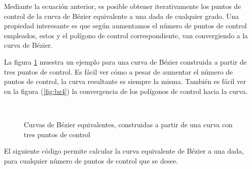 \begin{paracol}{2}
Mediante la ecuación anterior, es posible obtener iterativamente los puntos de control de la curva de Bézier equivalente a una dada de cualquier grado. Una propiedad interesante es que según aumentamos el número de puntos de control empleados, estos y el polígono de control correspondiente, van convergiendo a la curva de Bézier. 

La figura \ref{fig:bzgrad} muestra un ejemplo para una curva de Bézier construida a partir de tres puntos de control. Es fácil ver cómo a pesar de aumentar el número de puntos de control, la curva resultante es siempre la misma.  También es fácil ver en la figura (\ref{fig:bz4}) la convergencia de los polígonos de control hacia la curva.
\end{paracol}
\begin{figure}[h]
\centering
{} \qquad 
{}\\
 \qquad 
{}
\caption{Curvas de Bézier equivalentes, construidas a partir de una curva con tres puntos de control} 
\label{fig:bzgrad}
\end{figure}
\begin{paracol}{2}
El siguiente código permite calcular la curva equivalente de Bézier a una dada, para cualquier número de puntos de control que se desee. 
\end{paracol}
%
